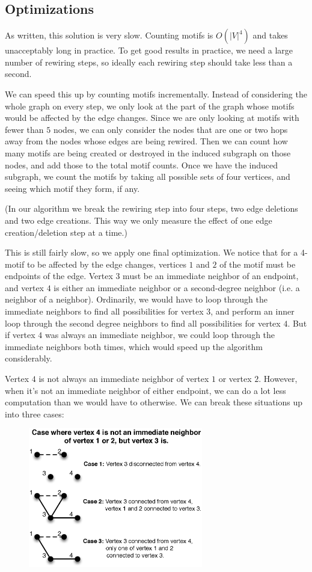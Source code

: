 \subsection{Optimizations}
As written, this solution is very slow.  Counting motifs is $O(|V|^4)$ and takes unacceptably long in practice.  To get good results in practice, we need a large number of rewiring steps, so ideally each rewiring step should take less than a second.

We can speed this up by counting motifs incrementally.  Instead of considering the whole graph on every step, we only look at the part of the graph whose motifs would be affected by the edge changes.  Since we are only looking at motifs with fewer than $5$ nodes, we can only consider the nodes that are one or two hops away from the nodes whose edges are being rewired.  Then we can count how many motifs are being created or destroyed in the induced subgraph on those nodes, and add those to the total motif counts.  Once we have the induced subgraph, we count the motifs by taking all possible sets of four vertices, and seeing which motif they form, if any.

(In our algorithm we break the rewiring step into four steps, two edge deletions and two edge creations.  This way we only measure the effect of one edge creation/deletion step at a time.)

This is still fairly slow, so we apply one final optimization.  We notice that for a 4-motif to be affected by the edge changes, vertices $1$ and $2$ of the motif must be endpoints of the edge.  Vertex $3$ must be an immediate neighbor of an endpoint, and vertex $4$ is either an immediate neighbor or a second-degree neighbor (i.e. a neighbor of a neighbor).  Ordinarily, we would have to loop through the immediate neighbors to find all possibilities for vertex $3$, and perform an inner loop through the second degree neighbors to find all possibilities for vertex $4$.  But if vertex $4$ was always an immediate neighbor, we could loop through the immediate neighbors both times, which would speed up the algorithm considerably.

Vertex $4$ is not always an immediate neighbor of vertex $1$ or vertex $2$.  However, when it's not an immediate neighbor of either endpoint, we can do a lot less computation than we would have to otherwise.  We can break these situations up into three cases:

\begin{figure}[t]
\centering
\includegraphics[width=3in]{Figures/case1.eps}
\label{fig:case}
\end{figure}

